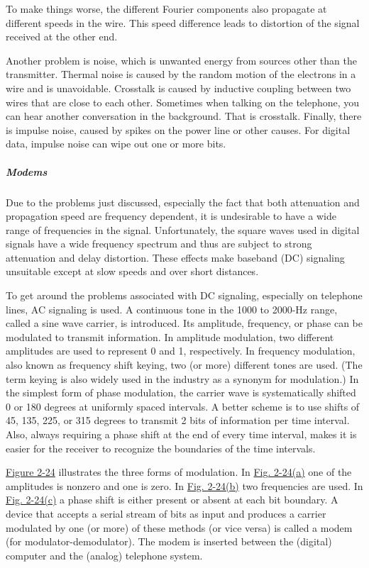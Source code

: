 \documentclass[b5paper,11pt]{memoir}
\begin{document}
To make things worse, the different Fourier components also propagate at
different speeds in the wire. This speed difference leads to
{distortion} of the signal received at the other end.

Another problem is {noise}, which is unwanted energy from sources other
than the transmitter. Thermal noise is caused by the random motion of
the electrons in a wire and is unavoidable. Crosstalk is caused by
inductive coupling between two wires that are close to each other.
Sometimes when talking on the telephone, you can hear another
conversation in the background. That is crosstalk. Finally, there is
impulse noise, caused by spikes on the power line or other causes. For
digital data, impulse noise can wipe out one or more bits.

\protect\hypertarget{0130661023_ch02lev1sec5.htmlux5cux23ch02lev3sec9}{}{}

\subparagraph{Modems}

Due to the problems just discussed, especially the fact that both
attenuation and propagation speed are frequency dependent, it is
undesirable to have a wide range of frequencies in the signal.
Unfortunately, the square waves used in digital signals have a wide
frequency spectrum and thus are subject to strong attenuation and delay
distortion. These effects make baseband (DC) signaling unsuitable except
at slow speeds and over short distances.

To get around the problems associated with DC signaling, especially on
telephone lines, AC signaling is used. A continuous tone in the 1000 to
2000-Hz range, called a {sine wave carrier}, is introduced. Its
amplitude, frequency, or phase can be modulated to transmit information.
In {amplitude modulation}, two different amplitudes are used to
represent 0 and 1, respectively. In {frequency modulation}, also known
as {frequency shift keying}, two (or more) different tones are used.
(The term {keying} is also widely used in the industry as a synonym for
modulation.) In the simplest form of {phase modulation}, the carrier
wave is systematically shifted 0 or 180 degrees at uniformly spaced
intervals. A better scheme is to use shifts of 45, 135, 225, or 315
degrees to transmit 2 bits of information per time interval. Also,
always requiring a phase shift at the end of every time interval, makes
it is easier for the receiver to recognize the boundaries of the time
intervals.

\protect\hyperlink{0130661023_ch02lev1sec5.htmlux5cux23ch02fig24}{Figure
2-24} illustrates the three forms of modulation. In
\protect\hyperlink{0130661023_ch02lev1sec5.htmlux5cux23ch02fig24}{Fig.
2-24(a)} one of the amplitudes is nonzero and one is zero. In
\protect\hyperlink{0130661023_ch02lev1sec5.htmlux5cux23ch02fig24}{Fig.
2-24(b)} two frequencies are used. In
\protect\hyperlink{0130661023_ch02lev1sec5.htmlux5cux23ch02fig24}{Fig.
2-24(c)} a phase shift is either present or absent at each bit boundary.
A device that accepts a serial stream of bits as input and produces a
carrier modulated by one (or more) of these methods (or vice versa) is
called a {modem} (for modulator-demodulator). The modem is inserted
between the (digital) computer and the (analog) telephone system.
\end{document}

